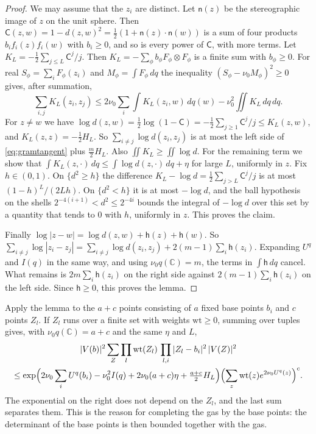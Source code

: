 \documentclass[11pt]{amsart}
\theoremstyle{definition}
\theoremstyle{remark}
\numberwithin{equation}{section}
\newcommand{\C}{\mathbb C}
\begin{document}
\begin{proof}
We may assume that the $z_i$ are distinct. Let $\mathsf n(z)$ be the stereographic image of $z$ on the unit sphere. Then
$\mathsf C(z,w)=1-d(z,w)^2=\frac12(1+\mathsf n(z)\cdot\mathsf n(w))$ is a sum of four products $b_if_i(z)f_i(w)$ with $b_i\ge0$, and so
is every power of $\mathsf C$, with more terms. Let $K_L=-\frac12\sum_{j\le L}\mathsf C^j/j$. Then $K_L=-\sum_\phi b_\phi F_\phi\otimes F_\phi$ is a finite sum with
$b_\phi\ge0$. For real $S_\phi=\sum_iF_\phi(z_i)$ and $M_\phi=\int F_\phi\,dq$ the inequality $(S_\phi-\nu_0M_\phi)^2\ge0$ gives, after summation,
\begin{equation}\label{eq:gramtangent}
 \sum_{i,j}K_L(z_i,z_j)\le2\nu_0\sum_i\int K_L(z_i,w)\,dq(w)-\nu_0^2\iint K_L\,dq\,dq .
\end{equation}
For $z\ne w$ we have $\log d(z,w)=\frac12\log(1-\mathsf C)=-\frac12\sum_{j\ge1}\mathsf C^j/j\le K_L(z,w)$, and $K_L(z,z)=-\frac12H_L$. So
$\sum_{i\ne j}\log d(z_i,z_j)$ is at most the left side of \eqref{eq:gramtangent} plus $\frac m2H_L$. Also $\iint K_L\ge\iint\log d$. For the
remaining term we show that $\int K_L(z,\cdot)\,dq\le\int\log d(z,\cdot)\,dq+\eta$ for large $L$, uniformly in $z$. Fix $h\in(0,1)$.
On $\{d^2\ge h\}$ the difference $K_L-\log d=\frac12\sum_{j>L}\mathsf C^j/j$ is at most $(1-h)^L/(2Lh)$. On $\{d^2<h\}$ it is at most $-\log d$, and
the ball hypothesis on the shells $2^{-4(i+1)}<d^2\le2^{-4i}$ bounds the integral of $-\log d$ over this set by a quantity that tends to
$0$ with $h$, uniformly in $z$. This proves the claim.

Finally $\log|z-w|=\log d(z,w)+\mathsf h(z)+\mathsf h(w)$. So $\sum_{i\ne j}\log|z_i-z_j|=\sum_{i\ne j}\log d(z_i,z_j)+2(m-1)\sum_i\mathsf h(z_i)$. Expanding
$U^q$ and $I(q)$ in the same way, and using $\nu_0q(\C)=m$, the terms in $\int\mathsf h\,dq$ cancel. What remains is
$2m\sum_i\mathsf h(z_i)$ on the right side against $2(m-1)\sum_i\mathsf h(z_i)$ on the left side. Since $\mathsf h\ge0$, this proves the lemma.
\end{proof}

Apply the lemma to the $a+c$ points consisting of $a$ fixed base points $b_i$ and $c$ points $Z_l$. If $Z_l$ runs over a finite set with
weights $\mathrm{wt}\ge0$, summing over tuples gives, with $\nu_0q(\C)=a+c$ and the same $\eta$ and $L$,
\begin{multline}\label{eq:tangent}
 |V(b)|^2\sum_{Z}\prod_l\mathrm{wt}(Z_l)\,\prod_{l,i}|Z_l-b_i|^2\,|V(Z)|^2\\
 \le\exp\Bigl(2\nu_0\sum_iU^q(b_i)-\nu_0^2I(q)+2\nu_0(a+c)\eta+\tfrac{a+c}2H_L\Bigr)\Bigl(\sum_z\mathrm{wt}(z)e^{2\nu_0U^q(z)}\Bigr)^c .
\end{multline}
The exponential on the right does not depend on the $Z_l$, and the last sum separates them. This is the reason for completing the
gas by the base points: the determinant of the base points is then bounded together with the gas.
\end{document}
